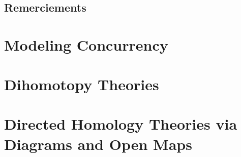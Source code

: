 \documentclass[a4paper,11pt,twoside]{book}
\begin{document}


\dominitoc

\newpage
~
\thispagestyle{empty}

\newpage


 \cleardoublepage

\chapter*{Remerciements}


\tableofcontents

\mainmatter



\part{Modeling Concurrency}







\part{Dihomotopy Theories}





\part{Directed Homology Theories via Diagrams and Open Maps}












\appendix







\printnomenclature

\cleardoublepage



\newpage
~
\thispagestyle{empty}
\newpage


\thispagestyle{empty}

\end{document}
